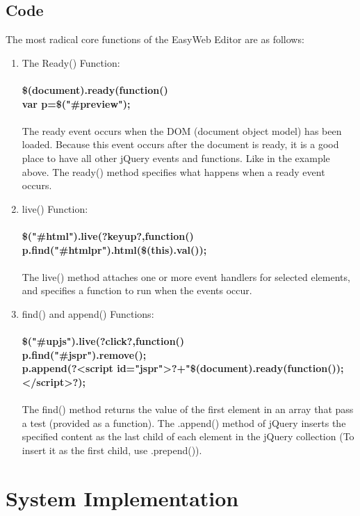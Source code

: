 \documentclass[12pt,a4paper]{article}
\begin{document}
\subsection{Code}
The most radical core functions of the EasyWeb Editor are as follows:
\begin{enumerate}
\item The Ready() Function:\\
\\
\textbf{\$(document).ready(function(){\\
       var p=\$("\#preview");}}\\
 \\The ready event occurs when the DOM (document object model) has been loaded.
Because this event occurs after the document is ready, it is a good place to have all other jQuery events and functions. Like in the example above.
The ready() method specifies what happens when a ready event occurs.
\item live() Function:\\
\\
\textbf{ \$("\#html").live(?keyup?,function(){
          p.find("\#htmlpr").html(\$(this).val());}}\\
\\
The live() method attaches one or more event handlers for selected elements, and specifies a function to run when the events occur.
\item find() and append() Functions:\\
\\

\textbf{ \$("\#upjs").live(?click?,function(){\\
            p.find("\#jspr").remove();\\
            p.append(?<script id="jspr">?+"\$(document).ready(function());\\
            </script>?);}}\\
\\
The find() method returns the value of the first element in an array that pass a test (provided as a function).
The .append() method of jQuery inserts the specified content as the last child of each element in the jQuery collection (To insert it as the first child, use .prepend()).\\

\end{enumerate}
\newpage
\section{System Implementation}
\end{document}
